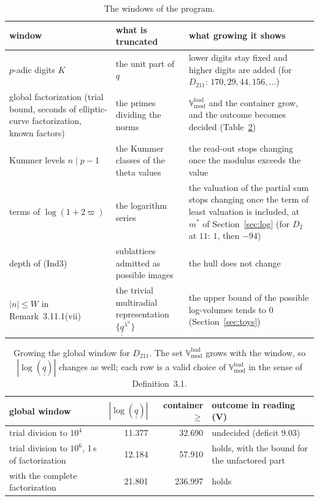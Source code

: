 \documentclass[11pt,a4paper]{article}
\newcommand{\qq}{\underline{\underline{q}}{}}
\newcommand{\Vbad}{\mathbb{V}^{\mathrm{bad}}_{\mathrm{mod}}}
\begin{document}
\begin{table}[H]
\centering\small
\begin{tabular}{>{\raggedright\arraybackslash}p{4.0cm}>{\raggedright\arraybackslash}p{4.0cm}>{\raggedright\arraybackslash}p{6.1cm}}
\toprule
window & what is truncated & what growing it shows\\
\midrule
$p$-adic digits $K$ & the unit part of $q$ & lower digits stay fixed and higher digits are added (for $D_{211}$: $170,29,44,156,\dots$)\\
global factorization (trial bound, seconds of elliptic-curve factorization, known factors) & the primes dividing the norms & $\Vbad$ and the container grow, and the outcome becomes decided (Table~\ref{tab:d211})\\
Kummer levels $n\mid p-1$ & the Kummer classes of the theta values & the read-out stops changing once the modulus exceeds the value\\
terms of $\log(1+2\varpi)$ & the logarithm series & the valuation of the partial sum stops changing once the term of least valuation is included, at $m^*$ of Section~\ref{sec:log} (for $D_2$ at $11$: $1$, then $-94$)\\
depth of (Ind3) & sublattices admitted as possible images & the hull does not change\\
$|n|\le W$ in Remark~3.11.1(vii) & the trivial multiradial representation $\{\qq^{\lambda^n}\}$ & the upper bound of the possible log-volumes tends to $0$ (Section~\ref{sec:toys})\\
\bottomrule
\end{tabular}
\caption{The windows of the program.}\label{tab:windows}
\end{table}

\begin{table}[H]
\centering\small
\begin{tabular}{>{\raggedright\arraybackslash}p{4.2cm}rr>{\raggedright\arraybackslash}p{5.0cm}}
\toprule
global window & $|\log(\qq)|$ & container $\ge$ & outcome in reading (V)\\
\midrule
trial division to $10^4$ & 11.377 & 32.690 & undecided (deficit 9.03)\\
trial division to $10^6$, 1\,s of factorization & 12.184 & 57.910 & holds, with the bound for the unfactored part\\
with the complete factorization & 21.801 & 236.997 & holds\\
\bottomrule
\end{tabular}
\caption{Growing the global window for $D_{211}$. The set $\Vbad$ grows with the window, so $|\log(\qq)|$ changes
as well; each row is a valid choice of $\Vbad$ in the sense of Definition~3.1.}\label{tab:d211}
\end{table}
\end{document}
